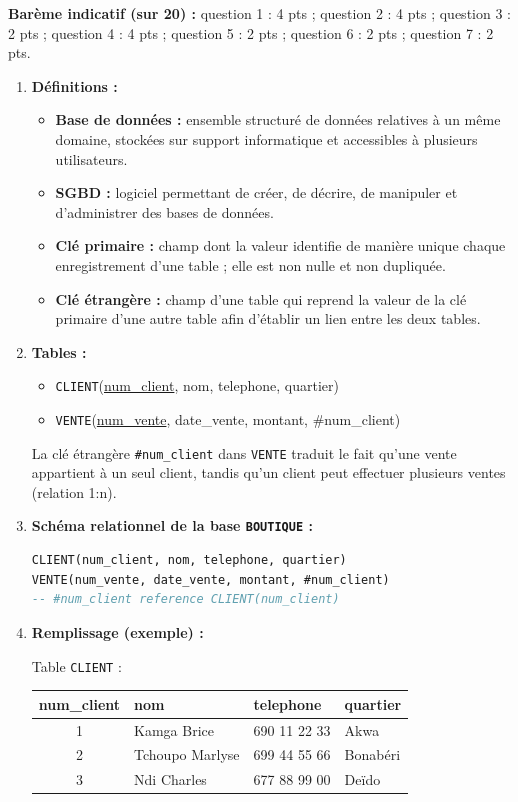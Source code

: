 \documentclass[11pt]{article}
\newcommand{\cle}[1]{{\popxbold\color{popdark}#1}}
\begin{document}
\begin{corrige}
\textbf{Barème indicatif (sur 20) :} question 1 : 4 pts ; question 2 : 4 pts ; question 3 : 2 pts ; question 4 : 4 pts ; question 5 : 2 pts ; question 6 : 2 pts ; question 7 : 2 pts.

\begin{enumerate}
\item \textbf{Définitions :}
\begin{itemize}
\item \textbf{\cle{Base de données} :} ensemble structuré de données relatives à un même domaine, stockées sur support informatique et accessibles à plusieurs utilisateurs.
\item \textbf{\cle{SGBD} :} logiciel permettant de créer, de décrire, de manipuler et d'administrer des bases de données.
\item \textbf{\cle{Clé primaire} :} champ dont la valeur identifie de manière unique chaque enregistrement d'une table ; elle est non nulle et non dupliquée.
\item \textbf{\cle{Clé étrangère} :} champ d'une table qui reprend la valeur de la clé primaire d'une autre table afin d'établir un lien entre les deux tables.
\end{itemize}
\item \textbf{Tables :}
\begin{itemize}
\item \texttt{CLIENT}(\underline{num\_client}, nom, telephone, quartier)
\item \texttt{VENTE}(\underline{num\_vente}, date\_vente, montant, \#num\_client)
\end{itemize}
La clé étrangère \texttt{\#num\_client} dans \texttt{VENTE} traduit le fait qu'une vente appartient à un seul client, tandis qu'un client peut effectuer plusieurs ventes (relation 1:n).
\item \textbf{Schéma relationnel de la base \texttt{BOUTIQUE} :}
\begin{lstlisting}[language=SQL]
CLIENT(num_client, nom, telephone, quartier)
VENTE(num_vente, date_vente, montant, #num_client)
-- #num_client reference CLIENT(num_client)
\end{lstlisting}
\item \textbf{Remplissage (exemple) :}

Table \texttt{CLIENT} :
\begin{center}
\begin{tabularx}{\linewidth}{|c|X|l|l|}
\hline
\rowcolor{popblueL} \textbf{num\_client} & \textbf{nom} & \textbf{telephone} & \textbf{quartier} \\
\hline
1 & Kamga Brice & 690 11 22 33 & Akwa \\
\hline
2 & Tchoupo Marlyse & 699 44 55 66 & Bonabéri \\
\hline
3 & Ndi Charles & 677 88 99 00 & Deïdo \\
\hline
\end{tabularx}
\end{center}


\end{enumerate}
\end{corrige}
\end{document}
